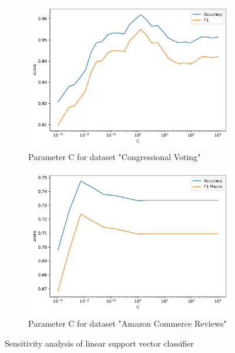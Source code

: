 \documentclass[a4paper,10pt]{article}
\begin{document}
\begin{figure}[h!]
    \captionsetup{justification=centering}
    \begin{subfigure}[b]{0.45\textwidth}
        \includegraphics[width=\textwidth]{congress/plots/LinearSVC_C_sensitivity_new.pdf}
        \caption{Parameter \textsf{C} for dataset "Congressional Voting"}
    \end{subfigure}
    \hfill
    \begin{subfigure}[b]{0.45\textwidth}
        \includegraphics[width=\textwidth]{amazon/plots/LinearSVC_C_sensitivity.pdf}
        \caption{Parameter \textsf{C} for dataset "Amazon Commerce Reviews"}
    \end{subfigure}
    \caption{Sensitivity analysis of linear support vector classifier}
    \label{fig: sensitivity lsvc}
\end{figure}
\end{document}
